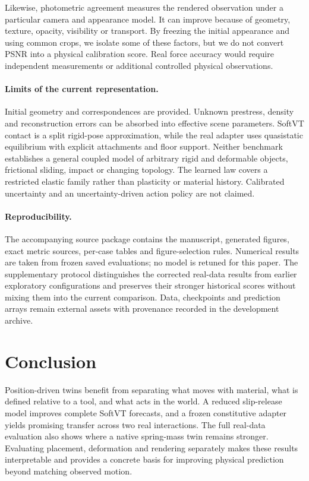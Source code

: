 \documentclass[10pt,twocolumn,letterpaper]{article}
\begin{document}
Likewise, photometric agreement measures the rendered observation under a particular camera and appearance model. It can improve because of geometry, texture, opacity, visibility or transport. By freezing the initial appearance and using common crops, we isolate some of these factors, but we do not convert PSNR into a physical calibration score. Real force accuracy would require independent measurements or additional controlled physical observations.

\paragraph{Limits of the current representation.}
Initial geometry and correspondences are provided. Unknown prestress, density and reconstruction errors can be absorbed into effective scene parameters. SoftVT contact is a split rigid-pose approximation, while the real adapter uses quasistatic equilibrium with explicit attachments and floor support. Neither benchmark establishes a general coupled model of arbitrary rigid and deformable objects, frictional sliding, impact or changing topology. The learned law covers a restricted elastic family rather than plasticity or material history. Calibrated uncertainty and an uncertainty-driven action policy are not claimed.

\paragraph{Reproducibility.}
The accompanying source package contains the manuscript, generated figures, exact metric sources, per-case tables and figure-selection rules. Numerical results are taken from frozen saved evaluations; no model is retuned for this paper. The supplementary protocol distinguishes the corrected real-data results from earlier exploratory configurations and preserves their stronger historical scores without mixing them into the current comparison. Data, checkpoints and prediction arrays remain external assets with provenance recorded in the development archive.

\section{Conclusion}
Position-driven twins benefit from separating what moves with material, what is defined relative to a tool, and what acts in the world. A reduced slip-release model improves complete SoftVT forecasts, and a frozen constitutive adapter yields promising transfer across two real interactions. The full real-data evaluation also shows where a native spring-mass twin remains stronger. Evaluating placement, deformation and rendering separately makes these results interpretable and provides a concrete basis for improving physical prediction beyond matching observed motion.
\end{document}
